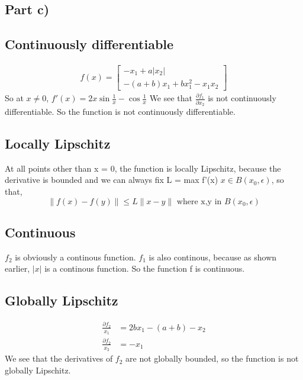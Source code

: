 \documentclass{article}
\begin{document}
\subsection*{Part c)}
\subsection*{Continuously differentiable}
\begin{align}
    f(x) = \begin{bmatrix}
   -x_1+a|x_2| \\
   -(a+b)x_1+bx_1^2-x_1x_2
\end{bmatrix}
\end{align}
So at $x\neq0$,
$f'(x) = 2x\sin\frac{1}{x} - \cos\frac{1}{x}$
We see that $\frac{\partial f_1}{\partial x_2}$ is not continuously differentiable. So the function is not continuously differentiable.
\subsection*{Locally Lipschitz}
At all points other than x = 0, the function is locally Lipschitz, because the derivative is bounded and we can always fix L = max f'(x) $x \in B(x_0, \epsilon)$, so that,
\begin{equation*}
    \|f(x) - f(y)\| \leq L\|x-y\| \textrm{ where x,y in } B(x_0, \epsilon)
\end{equation*}
 
\subsection*{Continuous}
$f_2$ is obviously a continous function. $f_1$ is also continous, because as shown earlier, $|x|$ is a continous function. So the function f is continuous.

\subsection*{Globally Lipschitz}
\begin{align}
    \frac{\partial f_2}{x_1} &= 2bx_1 - (a+b) - x_2 \\
    \frac{\partial f_2}{x_2} &= - x_1
\end{align}
We see that the derivatives of $f_2$ are not globally bounded, so the function is not globally Lipschitz. 
\end{document}
